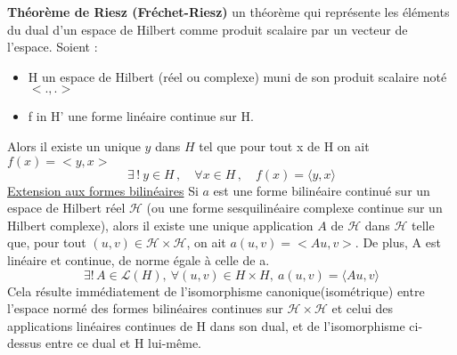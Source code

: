\textbf{Th\'eor\`eme de Riesz (Fr\'echet-Riesz)}\newline
un th\'eor\`eme qui repr\'esente les \'el\'ements du dual d'un espace de Hilbert comme produit scalaire par un vecteur de l'espace.
Soient :
\begin{itemize}
	\item H un espace de Hilbert (r\'eel ou complexe) muni de son produit scalaire not\'e $<.,.>$
	\item f in H' une forme lin\'eaire continue sur H.
\end{itemize}
Alors il existe un unique $y$ dans $H$ tel que pour tout x de H on ait $f(x) = <y, x>$
$$
\exists\,!\ y \in H\,, \quad \forall x\in H\,, \quad f(x) = \langle y,x\rangle
$$
\underline{Extension aux formes bilin\'eaires}\newline
Si $a$ est une forme bilin\'eaire continu\'e sur un espace de Hilbert r\'eel $\mathcal{H}$ (ou une forme sesquilin\'eaire complexe continue sur un Hilbert complexe),
alors il existe une unique application $A$ de $\mathcal{H}$ dans $\mathcal{H}$ telle que,
pour tout $(u, v) \in \mathcal{H} \times \mathcal{H}$, on ait $a(u, v) = <Au, v>$.
De plus, A est lin\'eaire et continue, de norme \'egale \`a celle de a.
$$ \exists !\,A\in\mathcal{L}(H),\ \forall (u,v)\in H\times H,\ a(u,v)=\langle Au,v \rangle $$
Cela r\'esulte imm\'ediatement de l'isomorphisme canonique(isom\'etrique) entre l'espace norm\'e des formes bilin\'eaires continues sur
$\mathcal{H} \times \mathcal{H}$ et celui des applications lin\'eaires continues de H dans son dual, et de l'isomorphisme ci-dessus entre ce dual et H lui-m\^eme.
\bigskip

